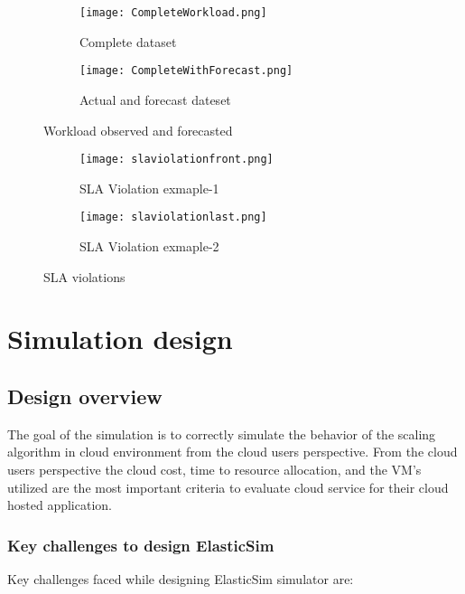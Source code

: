 \begin{figure}
     \centering
     \begin{subfigure}[b]{0.7\textwidth}
         \texttt{[image: CompleteWorkload.png]}
         \caption{Complete dataset}
         \label{figure:sampleworkload}
     \end{subfigure}
     \begin{subfigure}[b]{0.7\textwidth}
         \texttt{[image: CompleteWithForecast.png]}
         \caption{Actual and forecast dateset}
         \label{figure:forecasted}
     \end{subfigure}
     \caption{Workload observed and forecasted}
     \label{fig:workloads}
 \end{figure}
 \begin{figure}
      \centering
     \begin{subfigure}[b]{0.6\textwidth}
         \texttt{[image: slaviolationfront.png]}
         \caption{SLA Violation exmaple-1}
         \label{figure:slavioa}
     \end{subfigure}
     \begin{subfigure}[b]{0.6\textwidth}
         \texttt{[image: slaviolationlast.png]}
         \caption{SLA Violation exmaple-2}
         \label{figure:slaviob}
     \end{subfigure}
     \caption{SLA violations}
     \label{fig:slaviolationfig}
  \end{figure}


 \section{Simulation design}
 \label{sec:Simulation design}

 \subsection{Design overview}
 \label{sub:Design overview}
 The goal of the simulation is to correctly simulate the behavior of the scaling algorithm in cloud environment from the cloud users perspective. From the cloud users perspective the cloud cost, time to resource allocation, and the VM's utilized are the most important criteria to evaluate cloud service for their cloud hosted application\cite{kim2015pics}.

 \subsubsection{Key challenges to design ElasticSim}
 \label{subs:Key challenges to design ElasticSim}
 Key challenges faced while designing ElasticSim simulator are:

